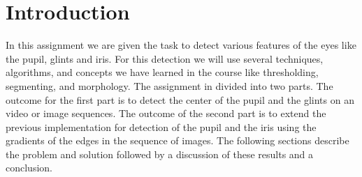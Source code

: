 \section{Introduction}
In this assignment we are given the task to detect various features of the eyes like the pupil, glints and iris. For this detection we will use several techniques, algorithms, and concepts we have learned in the course like thresholding, segmenting, and morphology. The assignment in divided into two parts. The outcome for the first part is to detect the center of the pupil and the glints on an video or image sequences. The outcome of the second part is to extend the previous implementation for detection of the pupil and the iris using the gradients of the edges in the sequence of images. The following sections describe the problem and solution followed by a discussion of these results and a conclusion.